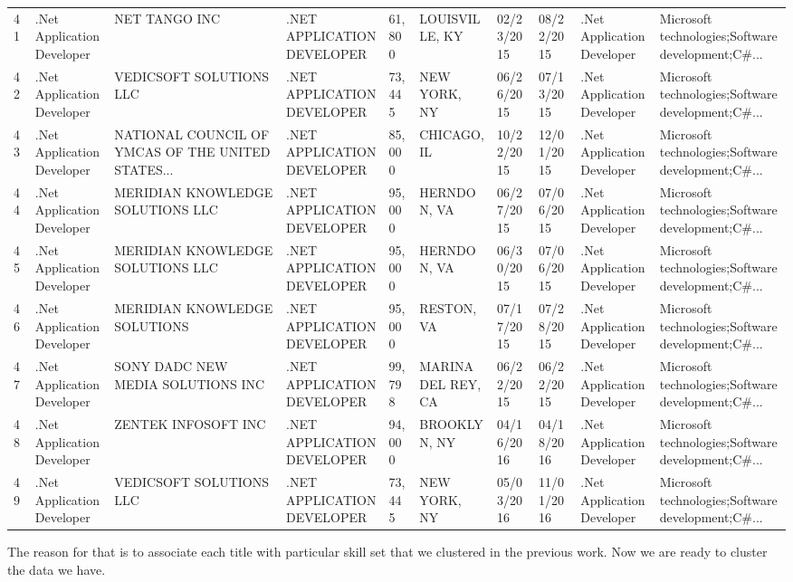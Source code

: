 \begin{table}[h!]
{\begin{tabular}{llllllllll}
	41 &  .Net Application Developer &                                      NET TANGO INC &  .NET APPLICATION DEVELOPER &      61,800 &      LOUISVILLE, KY &  02/23/2015 &  08/22/2015 &  .Net Application Developer &  Microsoft technologies;Software development;C\#... \\
	42 &  .Net Application Developer &                            VEDICSOFT SOLUTIONS LLC &  .NET APPLICATION DEVELOPER &      73,445 &        NEW YORK, NY &  06/26/2015 &  07/13/2015 &  .Net Application Developer &  Microsoft technologies;Software development;C\#... \\
	43 &  .Net Application Developer &  NATIONAL COUNCIL OF YMCAS OF THE UNITED STATES... &  .NET APPLICATION DEVELOPER &      85,000 &         CHICAGO, IL &  10/22/2015 &  12/01/2015 &  .Net Application Developer &  Microsoft technologies;Software development;C\#... \\
	44 &  .Net Application Developer &                   MERIDIAN KNOWLEDGE SOLUTIONS LLC &  .NET APPLICATION DEVELOPER &      95,000 &         HERNDON, VA &  06/27/2015 &  07/06/2015 &  .Net Application Developer &  Microsoft technologies;Software development;C\#... \\
	45 &  .Net Application Developer &                   MERIDIAN KNOWLEDGE SOLUTIONS LLC &  .NET APPLICATION DEVELOPER &      95,000 &         HERNDON, VA &  06/30/2015 &  07/06/2015 &  .Net Application Developer &  Microsoft technologies;Software development;C\#... \\
	46 &  .Net Application Developer &                       MERIDIAN KNOWLEDGE SOLUTIONS &  .NET APPLICATION DEVELOPER &      95,000 &          RESTON, VA &  07/17/2015 &  07/28/2015 &  .Net Application Developer &  Microsoft technologies;Software development;C\#... \\
	47 &  .Net Application Developer &                  SONY DADC NEW MEDIA SOLUTIONS INC &  .NET APPLICATION DEVELOPER &      99,798 &  MARINA DEL REY, CA &  06/22/2015 &  06/22/2015 &  .Net Application Developer &  Microsoft technologies;Software development;C\#... \\
	48 &  .Net Application Developer &                                ZENTEK INFOSOFT INC &  .NET APPLICATION DEVELOPER &      94,000 &        BROOKLYN, NY &  04/16/2016 &  04/18/2016 &  .Net Application Developer &  Microsoft technologies;Software development;C\#... \\
	49 &  .Net Application Developer &                            VEDICSOFT SOLUTIONS LLC &  .NET APPLICATION DEVELOPER &      73,445 &        NEW YORK, NY &  05/03/2016 &  11/01/2016 &  .Net Application Developer &  Microsoft technologies;Software development;C\#... \\
	\hline
\end{tabular}
		
	}
	
\end{table}
The reason for that is to associate each title with particular skill set that we clustered in the previous work. Now we are ready to cluster the data we have.
